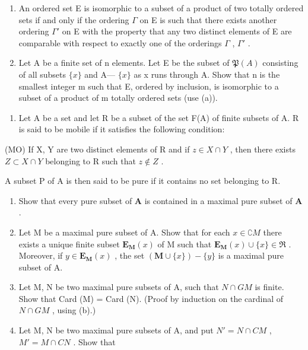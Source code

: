 \begin{enumerate}
\def\labelenumi{(\alph{enumi})}
\setcounter{enumi}{1}
\item
  An ordered set E is isomorphic to a subset of a product of two totally ordered sets if and only if the ordering \(\Gamma\) on E is such that there exists another ordering \(\Gamma'\) on E with the property that any two distinct elements of E are comparable with respect to exactly one of the orderings \(\Gamma\) , \(\Gamma'\) .
\item
  Let A be a finite set of n elements. Let E be the subset of \(\mathfrak{P}(A)\) consisting of all subsets \(\{x\}\) and A--- \(\{x\}\) as x runs through A. Show that n is the smallest integer m such that E, ordered by inclusion, is isomorphic to a subset of a product of m totally ordered sets (use (a)).
\end{enumerate}

\begin{enumerate}
\def\labelenumi{\arabic{enumi}.}
\setcounter{enumi}{10}
\tightlist
\item
  Let A be a set and let R be a subset of the set F(A) of finite subsets of A. R is said to be mobile if it satisfies the following condition:
\end{enumerate}

(MO) If X, Y are two distinct elements of R and if \(z \in X \cap Y\) , then there exists \(Z \subset X \cap Y\) belonging to R such that \(z \notin Z\) .

A subset P of A is then said to be pure if it contains no set belonging to R.

\begin{enumerate}
\def\labelenumi{(\alph{enumi})}
\item
  Show that every pure subset of \(\mathbf{A}\) is contained in a maximal pure subset of \(\mathbf{A}\) .
\item
  Let M be a maximal pure subset of A. Show that for each \(x \in \complement M\) there exists a unique finite subset \(\mathbf{E}_{\mathbf{M}}(x)\) of M such that \(\mathbf{E}_{\mathbf{M}}(x) \cup \{x\} \in \Re\) . Moreover, if \(y \in \mathbf{E}_{\mathbf{M}}(x)\) , the set \((\mathbf{M} \cup \{x\}) - \{y\}\) is a maximal pure subset of A.
\item
  Let M, N be two maximal pure subsets of A, such that \(N \cap GM\) is finite. Show that Card (M) = Card (N). (Proof by induction on the cardinal of \(N \cap GM\) , using (b).)
\item
  Let M, N be two maximal pure subsets of A, and put \(N' = N \cap CM\) , \(M' = M \cap CN\) . Show that
\end{enumerate}

